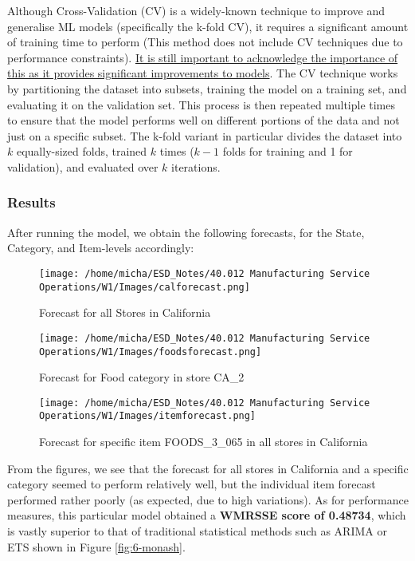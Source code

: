\documentclass[12pt]{article}
\begin{document}
Although Cross-Validation (CV) is a widely-known technique to improve and generalise ML models (specifically the k-fold CV), it requires a significant amount of training time to perform (This method does not include CV techniques due to performance constraints). \href{https://www.kaggle.com/c/m5-forecasting-accuracy/discussion/166814}{It is still important to acknowledge the importance of this as it provides significant improvements to models}. The CV technique works by partitioning the dataset into subsets, training the model on a training set, and evaluating it on the validation set. This process is then repeated multiple times to ensure that the model performs well on different portions of the data and not just on a specific subset. The k-fold variant in particular divides the dataset into $k$ equally-sized folds, trained $k$ times ($k-1$ folds for training and 1 for validation), and evaluated over $k$ iterations. 

\newpage

\subsubsection*{Results}

After running the model, we obtain the following forecasts, for the State, Category, and Item-levels accordingly:

\begin{figure}[H]
    \centering
    \texttt{[image: /home/micha/ESD\_Notes/40.012 Manufacturing Service Operations/W1/Images/calforecast.png]}
    \caption{Forecast for all Stores in California}
    \label{fig:6-calforecast}
\end{figure} 

\begin{figure}[H]
    \centering
    \texttt{[image: /home/micha/ESD\_Notes/40.012 Manufacturing Service Operations/W1/Images/foodsforecast.png]}
    \caption{Forecast for Food category in store CA\_2}
    \label{fig:6-foodforecast}
\end{figure} 

\begin{figure}[H]
    \centering
    \texttt{[image: /home/micha/ESD\_Notes/40.012 Manufacturing Service Operations/W1/Images/itemforecast.png]}
    \caption{Forecast for specific item FOODS\_3\_065 in all stores in California}
    \label{fig:6-itemforecast}
\end{figure} 

\noindent From the figures, we see that the forecast for all stores in California and a specific category seemed to perform relatively well, but the individual item forecast performed rather poorly (as expected, due to high variations). As for performance measures, this particular model obtained a \textbf{WMRSSE score of 0.48734}, which is vastly superior to that of traditional statistical methods such as ARIMA or ETS shown in Figure \ref{fig:6-monash}. \\ 
\end{document}
